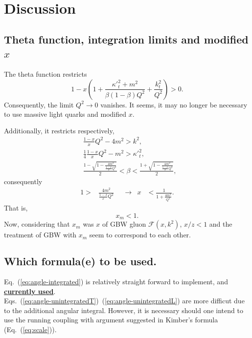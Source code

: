 \documentclass[12pt]{article}
\begin{document}
\section{Discussion}
\subsection{Theta function, integration limits and modified $x$}
The theta function restricts
\begin{equation}
1-x\left(1+\frac{{\kappa'}_t^2+m^2}{\beta(1-\beta)Q^2}+\frac{k_t^2}{Q^2}\right)>0.
\end{equation}
Consequently, the limit $Q^2\rightarrow0$ vanishes.
It seems, it may no longer be necessary to use massive light quarks and modified $x$.

Additionally, it restricts respectively,
\begin{align}
&\frac{1-x}{x}Q^2-4m^2>k^2,\\
&\frac{1}{4} \frac{1-x}{x}Q^2-m^2>{\kappa'}_t^2,\\
&\frac{1-\sqrt{1-\frac{4m^2}{\frac{1-x}{x} Q^2  }}}{2}<\beta< \frac{1+\sqrt{1-\frac{4m^2}{\frac{1-x}{x} Q^2  }}}{2},
\end{align}
consequently
\begin{align}
1>&\frac{4m^2}{\frac{1-x}{x} Q^2 }&& \rightarrow& x&<\frac{1}{1+\frac{4m^2}{Q^2}}.
\end{align}
That is, 
\begin{equation}
x_{m}<1.
\end{equation}
Now, considering that $x_m$ was $x$ of GBW gluon $\mathcal{F}(x,k^2)$, $x/z<1$ and the treatment of GBW with $x_m$ seem to correspond to each other.

\subsection{Which formula(e) to be used.}
Eq.~(\ref{eq:angle-integrated}) is relatively straight forward to implement, and \underline{\textbf{currently used}}. \\
Eqs.~(\ref{eq:angle-unintegratedT})~(\ref{eq:angle-unintegratedL}) are more difficut due to the additional angular integral. However, it is necessary should one intend to use the running coupling with argument suggested in Kimber's formula (Eq.~(\ref{eq:scale})).
\end{document}
